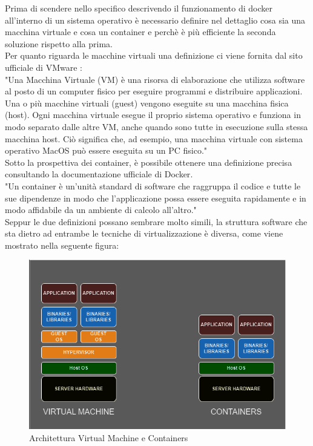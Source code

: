 Prima di scendere nello specifico descrivendo il funzionamento di docker all'interno di un sistema operativo è necessario definire nel dettaglio cosa sia una macchina virtuale e cosa un container e perchè è più efficiente la seconda soluzione rispetto alla prima.\\
Per quanto riguarda le macchine virtuali una definizione ci viene fornita dal sito ufficiale di VMware \cite{vmware}:\\
"Una Macchina Virtuale (VM) è una risorsa di elaborazione che utilizza software al posto di un computer fisico per eseguire programmi e distribuire applicazioni. Una o più macchine virtuali (guest) vengono eseguite su una macchina fisica (host). 
Ogni macchina virtuale esegue il proprio sistema operativo e funziona in modo separato dalle altre VM, anche quando sono tutte in esecuzione sulla stessa macchina host. Ciò significa che, ad esempio, una macchina virtuale con sistema operativo MacOS può essere eseguita su un PC fisico."\\

Sotto la prospettiva dei container, è possibile ottenere una definizione precisa consultando la documentazione ufficiale di Docker\cite{docker-container}.\\
"Un container è  un'unità standard di software che raggruppa il codice e tutte le sue dipendenze in modo che l'applicazione possa essere eseguita rapidamente e in modo affidabile da un ambiente di calcolo all'altro."\\

Seppur le due definizioni possano sembrare molto simili, la struttura software che sta dietro ad entrambe le tecniche di virtualizzazione è diversa, come viene mostrato nella seguente figura:\\


\begin{figure}[h]  %
    \centering
    \includegraphics[width=1\textwidth]{images/VMvsContainers.png}  %
    \caption{Architettura Virtual Machine e Containers}
    \label{fig:VMvsContainers}
\end{figure}
 
